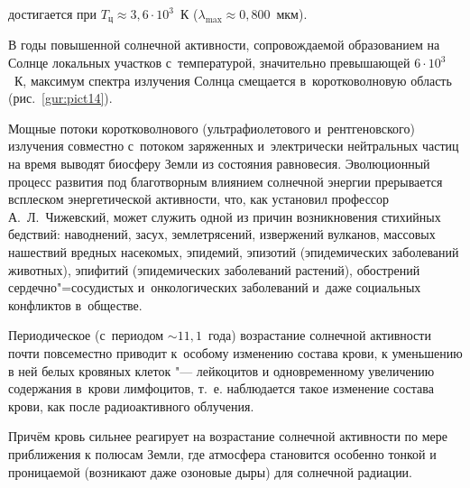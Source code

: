 достигается при $T_\text{ц} \approx 3,6\cdot 10^3$~К ($\lambda_{\max} \approx 0,800$~мкм).



В годы повышенной солнечной активности, сопровождаемой образованием на Солнце локальных участков с~температурой, значительно превышающей $6 \cdot 10^3$~К, максимум спектра излучения Солнца смещается в~коротковолновую область (рис.~\ref{gur:pict14}).

Мощные потоки коротковолнового (ультрафиолетового и~рентгеновского) излучения совместно с~потоком заряженных и~электрически нейтральных частиц на время выводят биосферу Земли из состояния равновесия. Эволюционный процесс развития под благотворным влиянием солнечной энергии прерывается всплеском энергетической активности, что, как установил профессор А.~Л.~Чижевский, может служить одной из причин возникновения стихийных бедствий: наводнений, засух, землетрясений, извержений вулканов, массовых нашествий вредных насекомых, эпидемий, эпизотий (эпидемических заболеваний животных), эпифитий (эпидемических заболеваний растений), обострений сердечно"=сосудистых и~онкологических заболеваний и~даже социальных конфликтов в~обществе. 

Периодическое (с~периодом $\sim  11,1$~года) возрастание солнечной активности почти повсеместно приводит к~особому изменению состава крови, к уменьшению в ней белых кровяных клеток "--- лейкоцитов и одновременному увеличению содержания в~крови лимфоцитов, т.~е. наблюдается такое изменение состава крови, как после радиоактивного облучения. 

Причём кровь сильнее реагирует на возрастание солнечной активности по мере приближения к полюсам Земли, где атмосфера становится особенно тонкой и проницаемой (возникают даже озоновые дыры) для солнечной радиации.





